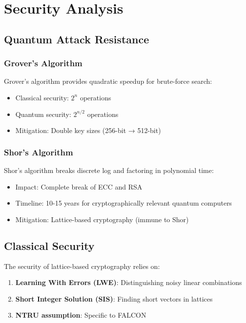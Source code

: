 \section{Security Analysis}


\subsection{Quantum Attack Resistance}

\subsubsection{Grover's Algorithm}
Grover's algorithm provides quadratic speedup for brute-force search:
\begin{itemize}
\item Classical security: $2^n$ operations
\item Quantum security: $2^{n/2}$ operations
\item Mitigation: Double key sizes (256-bit → 512-bit)
\end{itemize}

\subsubsection{Shor's Algorithm}
Shor's algorithm breaks discrete log and factoring in polynomial time:
\begin{itemize}
\item Impact: Complete break of ECC and RSA
\item Timeline: 10-15 years for cryptographically relevant quantum computers
\item Mitigation: Lattice-based cryptography (immune to Shor)
\end{itemize}

\subsection{Classical Security}

The security of lattice-based cryptography relies on:

\begin{enumerate}
\item \textbf{Learning With Errors (LWE)}: Distinguishing noisy linear combinations
\item \textbf{Short Integer Solution (SIS)}: Finding short vectors in lattices
\item \textbf{NTRU assumption}: Specific to FALCON
\end{enumerate}

